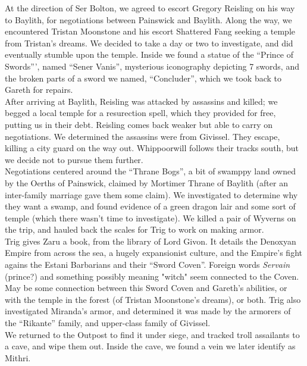 \documentclass[letterpaper]{article}
\begin{document}
\noindent At the direction of Ser Bolton, we agreed to escort Gregory Reisling on his way to Baylith, for negotiations between Painswick and Baylith.  Along the way, we encountered Tristan Moonstone and his escort Shattered Fang seeking a temple from Tristan's dreams. We decided to take a day or two to investigate, and did eventually stumble upon the temple.  Inside we found a statue of the ``Prince of Swords''', named ``Sener Vanis'', mysterious iconography depicting 7 swords, and the broken parts of a sword we named, ``Concluder'', which we took back to Gareth for repairs.\\

\noindent After arriving at Baylith, Reisling was attacked by assassins and killed; we begged a local temple for a resurection spell, which they provided for free, putting us in their debt.  Reisling comes back weaker but able to carry on negotiations.  We determined the assassins were from Givissel.  They escape, killing a city guard on the way out.  Whippoorwill follows their tracks south, but we decide not to pursue them further.\\

\noindent Negotiations centered around the ``Thrane Bogs'', a bit of swamppy land owned by the Oerths of Painswick, claimed by Mortimer Thrane of Baylith (after an inter-family marriage gave them some claim).  We investigated to determine why they want a swamp, and found evidence of a green dragon lair and some sort of temple (which there wasn't time to investigate).  We killed a pair of Wyverns on the trip, and hauled back the scales for Trig to work on making armor.\\

\noindent Trig gives Zaru a book, from the library of Lord Givon.  It details the Denoxyan Empire from across the sea, a hugely expansionist culture, and the Empire's fight agains the Estani Barbarians and their ``Sword Coven''. Foreign words \emph{Servain} (prince?) and something possibly meaning "witch" seem connected to the Coven.  May be some connection between this Sword Coven and Gareth's abilities, or with the temple in the forest (of Tristan Moonstone's dreams), or both.  Trig also investigated Miranda's armor, and determined it was made by the armorers of the ``Rikante'' family, and upper-class family of Givissel.\\

\noindent We returned to the Outpost to find it under siege, and tracked troll assailants to a cave, and wipe them out. Inside the cave, we found a vein we later identify as Mithri.\\
\end{document}
